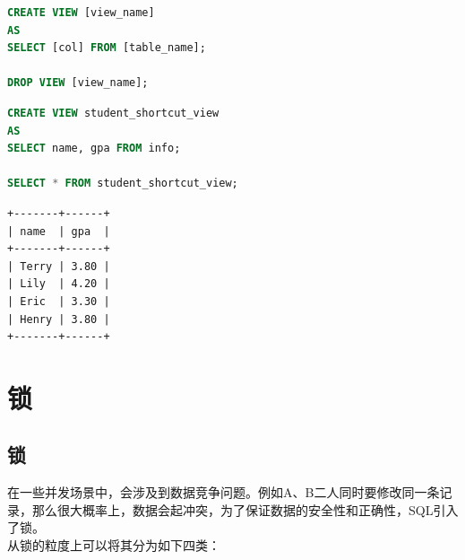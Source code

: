 \documentclass[12pt, openany, oneside]{book}
\begin{document}
\begin{lstlisting}[language=SQL]
CREATE VIEW [view_name] 
AS
SELECT [col] FROM [table_name];

DROP VIEW [view_name];
\end{lstlisting}

\vspace{0.5cm}


\begin{lstlisting}[language=SQL]
CREATE VIEW student_shortcut_view 
AS
SELECT name, gpa FROM info;

SELECT * FROM student_shortcut_view;
\end{lstlisting}

\begin{tcolorbox}
\begin{verbatim}
+-------+------+
| name  | gpa  |
+-------+------+
| Terry | 3.80 |
| Lily  | 4.20 |
| Eric  | 3.30 |
| Henry | 3.80 |
+-------+------+
	\end{verbatim}
\end{tcolorbox}

\newpage

\chapter{锁}

\section{锁}

在一些并发场景中，会涉及到数据竞争问题。例如A、B二人同时要修改同一条记录，那么很大概率上，数据会起冲突，为了保证数据的安全性和正确性，SQL引入了锁。\\

从锁的粒度上可以将其分为如下四类：

\begin{table}[H]
	\centering
	\caption{锁的粒度分类}
\end{table}
\end{document}
